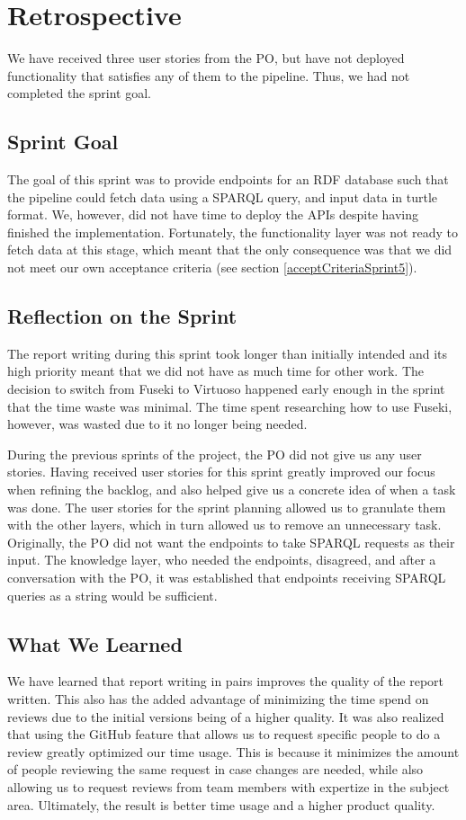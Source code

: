 \section{Retrospective}
We have received three user stories from the PO, but have not deployed functionality that satisfies any of them to the \knox{} pipeline. Thus, we had not completed the sprint goal.

\subsection{Sprint Goal}
The goal of this sprint was to provide endpoints for an RDF database such that the \knox{} pipeline could fetch data using a SPARQL query, and input data in turtle format. We, however, did not have time to deploy the APIs despite having finished the implementation. Fortunately, the functionality layer was not ready to fetch data at this stage, which meant that the only consequence was that we did not meet our own acceptance criteria (see section \ref{acceptCriteriaSprint5}).

\subsection{Reflection on the Sprint}
The report writing during this sprint took longer than initially intended and its high priority meant that we did not have as much time for other work.
The decision to switch from Fuseki to Virtuoso happened early enough in the sprint that the time waste was minimal. The time spent researching how to use Fuseki, however, was wasted due to it no longer being needed.

During the previous sprints of the project, the \knox{} PO did not give us any user stories. 
Having received user stories for this sprint greatly improved our focus when refining the backlog, and also helped give us a concrete idea of when a task was done. 
The user stories for the sprint planning allowed us to granulate them with the other layers, which in turn allowed us to remove an unnecessary task. Originally, the \knox{} PO did not want the endpoints to take SPARQL requests as their input.
The knowledge layer, who needed the endpoints, disagreed, and after a conversation with the \knox{} PO, it was established that endpoints receiving SPARQL queries as a string would be sufficient.

\subsection{What We Learned}
We have learned that report writing in pairs improves the quality of the report written. This also has the added advantage of minimizing the time spend on reviews due to the initial versions being of a higher quality.
It was also realized that using the GitHub feature that allows us to request specific people to do a review greatly optimized our time usage. 
This is because it minimizes the amount of people reviewing the same request in case changes are needed, while also allowing us to request reviews from team members with expertize in the subject area.
Ultimately, the result is better time usage and a higher product quality. 

